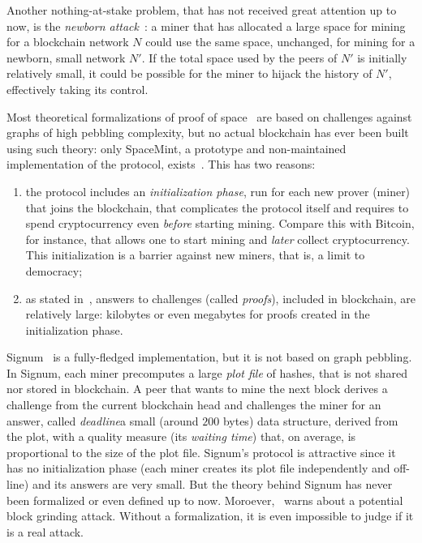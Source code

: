 Another nothing-at-stake problem, that has not received great attention up to now,
is the \emph{newborn attack}~\cite{TangZDWLG0L19}: a miner that has allocated a large space
for mining for a blockchain network $N$ could use the same space, unchanged, for
mining for a newborn, small network $N'$. If the total space used by the peers of $N'$ is
initially relatively small, it could be possible for the miner to hijack the history of $N'$,
effectively taking its control.

Most theoretical formalizations of proof of space~\cite{AtenieseBFG14,DziembowskiFKP15,RenD16} are
based on challenges against graphs of high pebbling complexity, but
no actual blockchain has ever been built using such theory: only SpaceMint, a prototype and non-maintained
implementation of the protocol, exists~\cite{ParkKFGAP18}. This has two reasons:
%
\begin{enumerate}
\item the protocol includes an \emph{initialization phase},
  run for each new prover (miner) that joins the blockchain,
  that complicates the protocol itself and
  requires to spend cryptocurrency even \emph{before}
  starting mining. Compare this with Bitcoin, for instance, that allows one to start mining
  and \emph{later} collect cryptocurrency. This initialization is a barrier against new
  miners, that is, a limit to democracy;
\item as stated in~\cite{AbusalahACKPR17}, answers to challenges (called \emph{proofs}),
  included in blockchain, are relatively large:
  kilobytes or even megabytes for proofs created in the initialization phase.
\end{enumerate}
%
Signum~\cite{Signum} is a fully-fledged implementation, but it is not based on graph pebbling.
In Signum, each miner precomputes a large \emph{plot file} of hashes, that is not shared nor
stored in blockchain.
A peer that wants to mine the next block derives a challenge from the current blockchain head
and challenges the miner for an answer, called
\emph{deadline}\ie a small (around $200$ bytes) data structure, derived from the plot, with a quality measure
(its \emph{waiting time}) that, on average, is proportional to the size of the plot file.
Signum's protocol is attractive since it has no initialization phase (each miner creates its plot file
independently and off-line) and its answers are very small.
But the theory behind Signum has never been formalized
or even defined up to now.
Moroever, \cite{ParkKFGAP18}~warns about a potential block grinding attack.
Without a formalization, it is even impossible to judge if it is a real attack.

